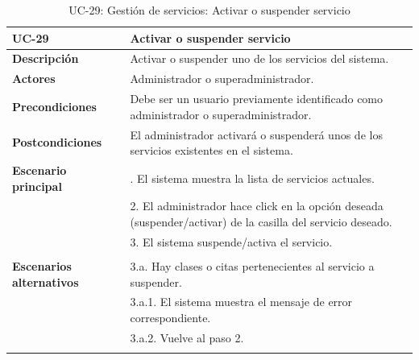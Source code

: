 \begin{table}
  \begin{center}
    \begin{tabularx}{16.4cm}{|l|X|}
      \hline
      \textbf{UC-29} & \textbf{Activar o suspender servicio}\\
      \hline
      \textbf{Descripción} & Activar o suspender uno de los servicios del sistema.\\
      \hline
      \textbf{Actores} & Administrador o superadministrador.\\
      \hline
      \textbf{Precondiciones} & Debe ser un usuario previamente identificado como administrador o superadministrador.\\
      \hline
      \textbf{Postcondiciones} & El administrador activará o suspenderá unos de los servicios existentes en el sistema.\\
      \hline
      \textbf{Escenario principal} & \smallskip 1. El sistema muestra la lista de servicios actuales.\\
      & 2. El administrador hace click en la opción deseada (suspender/activar) de la casilla del servicio deseado.\\
      & 3. El sistema suspende/activa el servicio.\\
      & \\
      \hline
      \textbf{Escenarios alternativos} & \smallskip 3.a. Hay clases o citas pertenecientes al servicio a suspender.\\
      & \hspace{0.3cm} 3.a.1. El sistema muestra el mensaje de error correspondiente.\\
      & \hspace{0.3cm} 3.a.2. Vuelve al paso 2.\\      
      & \\
      \hline
    \end{tabularx}
    \caption{UC-29: Gestión de servicios: Activar o suspender servicio}
    \label{tab:CU-activar-suspender-servicio}
  \end{center}
\end{table}


